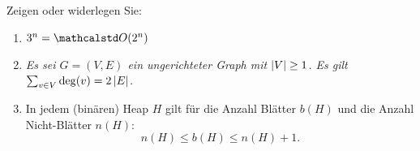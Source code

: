 \documentclass[10pt]{article}
\begin{document}
    \makecover

    \begin{aufgabe}[0]
        Zeigen oder widerlegen Sie:
    \end{aufgabe}

    \begin{loesung}
        \begin{enumerate}
            \item \textsl{$3^n = \O(2^n)$}

            \item \textsl{Es sei $G = (V, E)$ ein ungerichteter Graph mit $\left|V\right| \geq 1$.
            Es gilt $\sum_{v \in V} \deg(v) = 2 \left|E\right|$.}

            \item In jedem (binären) Heap $H$ gilt für die Anzahl Blätter $b(H)$ und die Anzahl Nicht-Blätter $n(H)$:
            \[
                n(H) \leq b(H) \leq n(H) + 1.
            \]
        \end{enumerate}
    \end{loesung}
\end{document}
